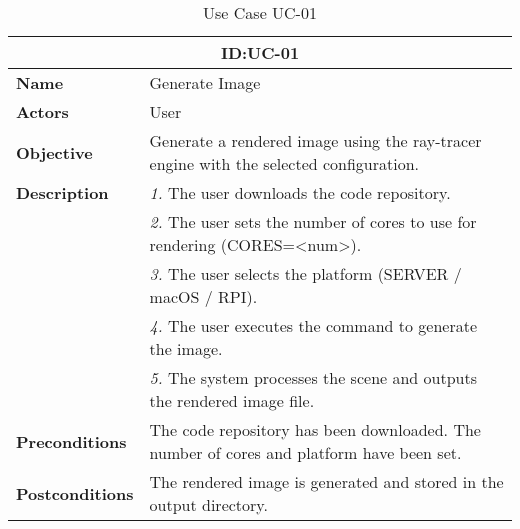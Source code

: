 \begin{table}[H]
    \centering
    \begin{tabular}{l p{10cm}}
        \toprule
        \multicolumn{2}{c}{\textbf{ID:\@ UC-01}} \\
        \toprule
        \textbf{Name}               &  Generate Image \\
        \textbf{Actors}             &  User \\
        \textbf{Objective}          &  Generate a rendered image using the ray-tracer engine with the selected configuration. \\
        \textbf{Description}        & \textsl{1.} The user downloads the code repository. \\
                                   & \textsl{2.} The user sets the number of cores to use for rendering (CORES=<num>). \\
                                   & \textsl{3.} The user selects the platform (SERVER / macOS / RPI). \\
                                   & \textsl{4.} The user executes the command to generate the image. \\
                                   & \textsl{5.} The system processes the scene and outputs the rendered image file. \\
        \textbf{Preconditions}      &  The code repository has been downloaded. The number of cores and platform have been set. \\
        \textbf{Postconditions}     &  The rendered image is generated and stored in the output directory. \\
    \end{tabular}
    \caption{Use Case UC-01}\label{tab:uc-01}
\end{table}

